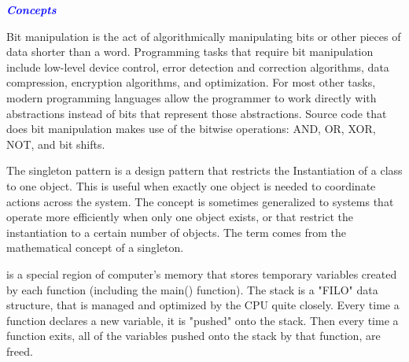 \documentclass[9pt]{amsart}
\newcommand{\filldots}{\noindent \textbf {\textcolor {blue} {\dotfill}} }
\begin{document}
\begin{multicols}{2}
\noindent {\textcolor {blue} {\em Breadth First Search}} 

\filldots 

\noindent {\textcolor {blue} {\em Depth First Search}} 

\filldots 


\filldots 

\noindent {\textcolor {blue} {\em Binary Search}} 

\filldots 

\noindent {\textcolor {blue} {\em Tree Insert / Find / etc... }} 

\filldots 

\noindent {\textcolor {blue} {\em $O(n * log(n))$ sorting Algorithms}} 

\filldots 

\noindent \textbf {\textcolor {blue} {\em Concepts}} 

\filldots 

\noindent {\textcolor {blue} {\em Bit Manipulation}} 

\noindent Bit manipulation is the act of algorithmically manipulating bits or other pieces of data shorter than a word. Programming tasks that require bit manipulation include low-level device control, error detection and correction algorithms, data compression, encryption algorithms, and optimization. For most other tasks, modern programming languages allow the programmer to work directly with abstractions instead of bits that represent those abstractions. Source code that does bit manipulation makes use of the bitwise operations: AND, OR, XOR, NOT, and bit shifts.

\noindent {\textcolor {blue} {\em Singleton Design Pattern}} 

\noindent The singleton pattern is a design pattern that restricts the Instantiation of a class to one object. This is useful when exactly one object is needed to coordinate actions across the system. The concept is sometimes generalized to systems that operate more efficiently when only one object exists, or that restrict the instantiation to a certain number of objects. The term comes from the mathematical concept of a singleton.

\filldots 

\noindent {\textcolor {blue} {\em Factory Design Pattern}} 

\filldots 

\noindent {\textcolor {blue} {\em Memory (Stack vs Heap)}} 

\noindent {\textcolor {blue} {\em Stack}} 
is a special region of computer's memory that stores temporary variables created by each function (including the main() function). The stack is a "FILO" data structure, that is managed and optimized by the CPU quite closely. Every time a function declares a new variable, it is "pushed" onto the stack. Then every time a function exits, all of the variables pushed onto the stack by that function, are freed.


\end{multicols}
\end{document}
